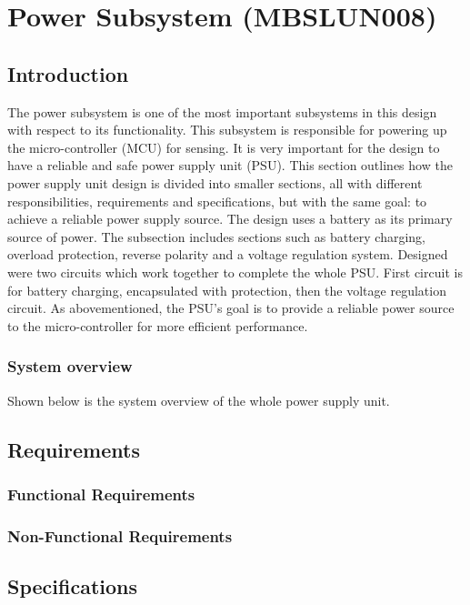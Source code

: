 \documentclass[class=report,11pt,crop=false]{standalone}
\begin{document}
	\chapter{Power Subsystem (MBSLUN008)}
	\vspace{0.5cm}
	\section{Introduction}
	The power subsystem is one of the most important subsystems in this design with respect to its functionality. This subsystem is responsible for powering up the micro-controller (MCU) for sensing. It is very important for the design to have a reliable and safe power supply unit (PSU). This section outlines how the power supply unit design is divided into smaller sections, all with different responsibilities, requirements and specifications, but with the same goal: to achieve a reliable power supply source. The design uses a battery as its primary source of power. The subsection includes sections such as battery charging, overload protection, reverse polarity and a voltage regulation system. Designed were two circuits which work together to complete the whole PSU. First circuit is for battery charging, encapsulated with protection, then the voltage regulation circuit. As abovementioned, the PSU's goal is to provide a reliable power source to the micro-controller for more efficient performance. 
	
	\subsection{System overview}
	
	Shown below is the system overview of the whole power supply unit. 
	
	\section{Requirements}
	\subsection{Functional Requirements}
	\subsection{Non-Functional Requirements}
	\vspace{0.5cm}
	\section{Specifications}
	
\end{document}
